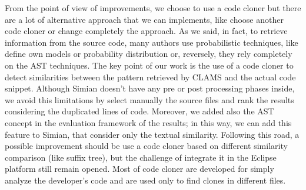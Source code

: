 From the point of view of improvements, we choose to use a code cloner but there are a lot of alternative approach that we can implements, like choose another code cloner or change completely the approach. As we said, in fact, to retrieve information from the source code, many authors use probabilistic techniques, like define own models or probability distribution or, reversely, they rely completely on the AST techniques. The key point of our work is the use of a code cloner to detect similarities between the pattern retrieved by CLAMS and the actual code snippet. Although Simian doesn't have any pre or post processing phases inside, we avoid this limitations by select manually the source files and rank the results considering the duplicated lines of code. Moreover, we added also the AST concept in the evaluation framework of the results; in this way, we can add this feature to Simian, that consider only the textual similarity. Following this road, a possible improvement should be use a code cloner based on different similarity comparison (like suffix tree), but the challenge of integrate it in the Eclipse platform still remain opened. Most of code cloner are developed for simply analyze the developer's code and are used only to find clones in different files.   
